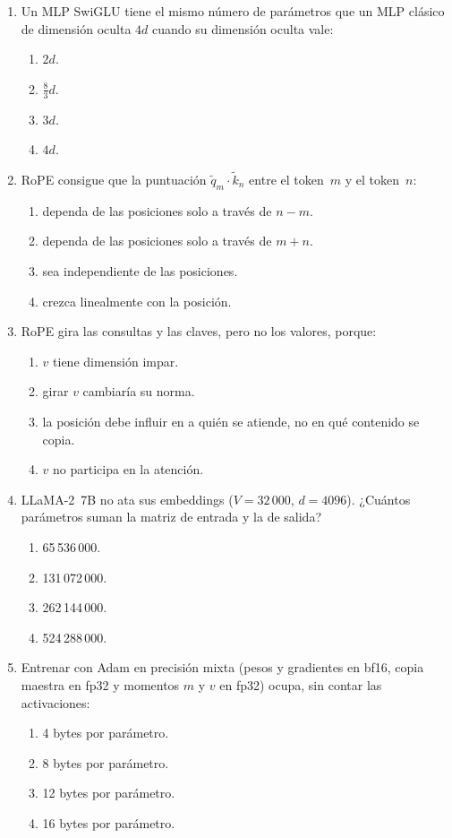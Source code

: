 \begin{enumerate}[label=\textbf{A.\arabic*.},ref=A.\arabic*,leftmargin=2.6em,itemsep=8pt]
\item\label{q:swiglu} Un MLP SwiGLU tiene el mismo número de parámetros que un MLP clásico de dimensión oculta $4d$ cuando su dimensión oculta vale: \punto
\begin{enumerate}[label=(\alph*)]
  \item $2d$.
  \item $\tfrac{8}{3}d$.
  \item $3d$.
  \item $4d$.
\end{enumerate}

\item\label{q:rope-rel} RoPE consigue que la puntuación $\tilde q_m\cdot\tilde k_n$ entre el token~$m$ y el token~$n$: \punto
\begin{enumerate}[label=(\alph*)]
  \item dependa de las posiciones solo a través de $n-m$.
  \item dependa de las posiciones solo a través de $m+n$.
  \item sea independiente de las posiciones.
  \item crezca linealmente con la posición.
\end{enumerate}

\item\label{q:rope-v} RoPE gira las consultas y las claves, pero no los valores, porque: \punto
\begin{enumerate}[label=(\alph*)]
  \item $v$ tiene dimensión impar.
  \item girar $v$ cambiaría su norma.
  \item la posición debe influir en a quién se atiende, no en qué contenido se copia.
  \item $v$ no participa en la atención.
\end{enumerate}

\item\label{q:llama-emb} LLaMA-2~7B no ata sus embeddings ($V=32\,000$, $d=4096$). ¿Cuántos parámetros suman la matriz de entrada y la de salida? \punto
\begin{enumerate}[label=(\alph*)]
  \item 65\,536\,000.
  \item 131\,072\,000.
  \item 262\,144\,000.
  \item 524\,288\,000.
\end{enumerate}

\item\label{q:16bytes} Entrenar con Adam en precisión mixta (pesos y gradientes en bf16, copia maestra en fp32 y momentos $m$ y $v$ en fp32) ocupa, sin contar las activaciones: \punto
\begin{enumerate}[label=(\alph*)]
  \item 4 bytes por parámetro.
  \item 8 bytes por parámetro.
  \item 12 bytes por parámetro.
  \item 16 bytes por parámetro.
\end{enumerate}


\end{enumerate}
